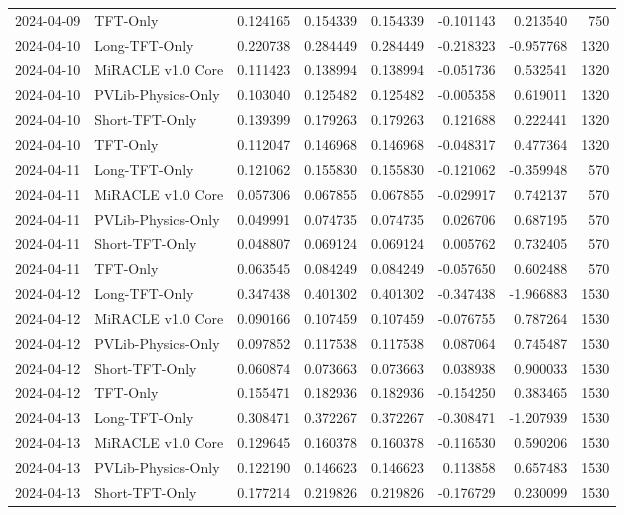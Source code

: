 \begin{tabular}{llrrrrrr}
2024-04-09 & TFT-Only & 0.124165 & 0.154339 & 0.154339 & -0.101143 & 0.213540 & 750 \\
2024-04-10 & Long-TFT-Only & 0.220738 & 0.284449 & 0.284449 & -0.218323 & -0.957768 & 1320 \\
2024-04-10 & MiRACLE v1.0 Core & 0.111423 & 0.138994 & 0.138994 & -0.051736 & 0.532541 & 1320 \\
2024-04-10 & PVLib-Physics-Only & 0.103040 & 0.125482 & 0.125482 & -0.005358 & 0.619011 & 1320 \\
2024-04-10 & Short-TFT-Only & 0.139399 & 0.179263 & 0.179263 & 0.121688 & 0.222441 & 1320 \\
2024-04-10 & TFT-Only & 0.112047 & 0.146968 & 0.146968 & -0.048317 & 0.477364 & 1320 \\
2024-04-11 & Long-TFT-Only & 0.121062 & 0.155830 & 0.155830 & -0.121062 & -0.359948 & 570 \\
2024-04-11 & MiRACLE v1.0 Core & 0.057306 & 0.067855 & 0.067855 & -0.029917 & 0.742137 & 570 \\
2024-04-11 & PVLib-Physics-Only & 0.049991 & 0.074735 & 0.074735 & 0.026706 & 0.687195 & 570 \\
2024-04-11 & Short-TFT-Only & 0.048807 & 0.069124 & 0.069124 & 0.005762 & 0.732405 & 570 \\
2024-04-11 & TFT-Only & 0.063545 & 0.084249 & 0.084249 & -0.057650 & 0.602488 & 570 \\
2024-04-12 & Long-TFT-Only & 0.347438 & 0.401302 & 0.401302 & -0.347438 & -1.966883 & 1530 \\
2024-04-12 & MiRACLE v1.0 Core & 0.090166 & 0.107459 & 0.107459 & -0.076755 & 0.787264 & 1530 \\
2024-04-12 & PVLib-Physics-Only & 0.097852 & 0.117538 & 0.117538 & 0.087064 & 0.745487 & 1530 \\
2024-04-12 & Short-TFT-Only & 0.060874 & 0.073663 & 0.073663 & 0.038938 & 0.900033 & 1530 \\
2024-04-12 & TFT-Only & 0.155471 & 0.182936 & 0.182936 & -0.154250 & 0.383465 & 1530 \\
2024-04-13 & Long-TFT-Only & 0.308471 & 0.372267 & 0.372267 & -0.308471 & -1.207939 & 1530 \\
2024-04-13 & MiRACLE v1.0 Core & 0.129645 & 0.160378 & 0.160378 & -0.116530 & 0.590206 & 1530 \\
2024-04-13 & PVLib-Physics-Only & 0.122190 & 0.146623 & 0.146623 & 0.113858 & 0.657483 & 1530 \\
2024-04-13 & Short-TFT-Only & 0.177214 & 0.219826 & 0.219826 & -0.176729 & 0.230099 & 1530 \\

\end{tabular}
